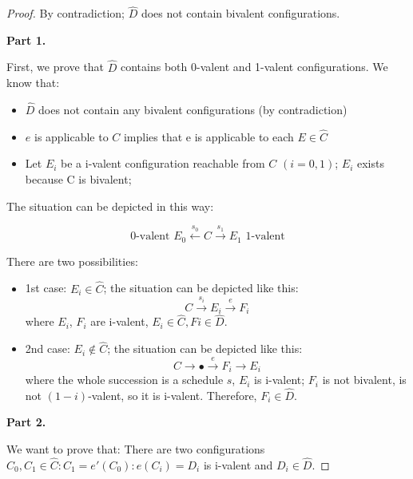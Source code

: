 \documentclass[a4paper,11pt,hidelinks]{article}
\begin{document}
\begin{proof}
    By contradiction; $\hat{D}$ does not contain bivalent configurations.

    \medskip

    \noindent\textbf{Part 1.}

    \medskip

    First, we prove that $\hat{D}$ contains both 0-valent and 1-valent configurations. We know that:

    \begin{itemize}
        \item $\hat{D}$ does not contain any bivalent configurations (by contradiction)
        \item $e$ is applicable to $C$ implies that e is applicable to each $E \in \hat{C}$
        \item Let $E_i$ be a i-valent configuration reachable from $C$ $(i = 0, 1)$; $E_i$ exists because C is bivalent;
    \end{itemize}

    The situation can be depicted in this way:

    $$
        \text{0-valent      } E_0 \xleftarrow{s_0} C \xrightarrow{s_1} E_1 \text{      1-valent}
    $$

    There are two possibilities:

    \begin{itemize}
        \item 1st case: $E_i \in \hat{C}$; the situation can be depicted like this:
              $$
                  C \xrightarrow{s_i} E_i \xrightarrow{e} F_i
              $$
              where $E_i$, $F_i$ are i-valent, $E_i \in \hat{C}, Fi \in \hat{D}$.
        \item 2nd case: $E_i \notin \hat{C}$; the situation can be depicted like this:
              $$
                  C \rightarrow \bullet \xrightarrow{e} F_i \rightarrow E_i
              $$
              where the whole succession is a schedule $s$, $E_i$ is i-valent; $F_i$ is not bivalent, is not $(1−i)$-valent, so it is i-valent. Therefore, $F_i \in \hat{D}$.
    \end{itemize}

    \medskip

    \noindent\textbf{Part 2.}

    \medskip

    We want to prove that: There are two configurations $C_0, C_1 \in \hat{C} : C_1 = e'(C_0) : e(C_i) = D_i$ is i-valent and $D_i \in \hat{D}$.


\end{proof}
\end{document}
